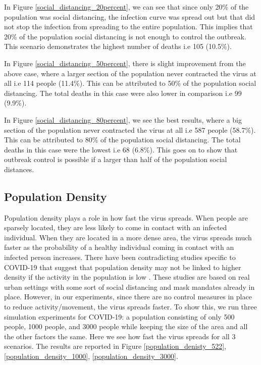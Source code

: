 \documentclass[11pt]{article}
\begin{document}
\begin{enumerate}
In Figure \ref{social_distancing_20percent}, we can see that since only 20\% of the population was social distancing, the infection curve was spread out but that did not stop the infection from spreading to the entire population. This implies that 20\% of the population social distancing is not enough to control the outbreak. This scenario demonstrates the highest number of deaths i.e 105 (10.5\%).


In Figure \ref{social_distancing_50percent}, there is slight improvement from the above case, where a larger section of the population never contracted the virus at all i.e 114 people (11.4\%). This can be attributed to 50\% of the population social distancing. The total deaths in this case were also lower in comparison i.e 99 (9.9\%). 

In Figure \ref{social_distancing_80percent}, we see the best results, where a big section of the population never contracted the virus at all i.e 587 people (58.7\%). This can be attributed to 80\% of the population social distancing. The total deaths in this case were the lowest i.e 68 (6.8\%). This goes on to show that outbreak control is possible if a larger than half of the population social distances.
\end{enumerate}

\subsection{Population Density}
Population density plays a role in how fast the virus spreads. When people are sparsely located, they are less likely to come in contact with an infected individual\cite{density}. When they are located in a more dense area, the virus spreads much faster as the probability of a healthy individual coming in contact with an infected person increases. There have been contradicting studies specific to COVID-19 that suggest that population density may not be linked to higher density if the activity in the population is low \cite{covid_lowdeath}\cite{covid_urban}. These studies are based on real urban settings with some sort of social distancing and mask mandates already in place. However, in our experiments, since there are no control measures in place to reduce activity/movement, the virus spreads faster. To show this, we run three simulation experiments for COVID-19: a population consisting of only 500 people, 1000 people, and 3000 people while keeping the size of the area and all the other factors the same. Here we see how fast the virus spreads for all 3 scenarios. The results are reported in Figure \ref{population_denisty_522}, \ref{population_density_1000}, \ref{population_density_3000}. 
\end{document}
